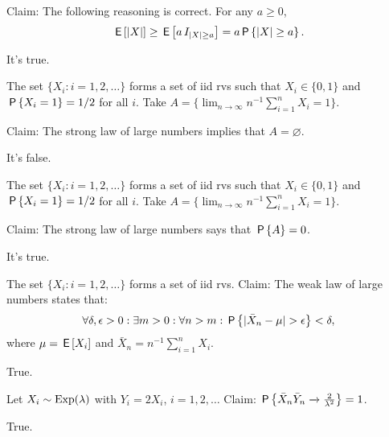 \documentclass[tf-tutorial-all.tex]{subfiles}
\begin{document}
\begin{truefalse}
Claim: The following reasoning is correct. For any $a\geq 0$,
\begin{equation}
\label{eq:8}
\E{|X|} \geq \E{a \1{|X|\geq a}} = a \P{|X| \geq a}.
\end{equation}

\begin{solution}
It's true.
\end{solution}
\end{truefalse}

\begin{truefalse}
The set $\{X_i : i = 1, 2, \ldots\}$ forms a set of iid rvs such that $X_i\in \{0, 1\}$ and $\P{X_i=1} = 1/2$ for all $i$.
Take $A=\{\lim_{n\to\infty} n^{-1}\sum_{i=1}^{n}X_i = 1\}$.

Claim: The strong law of large numbers implies that $A=\varnothing$.

\begin{solution}
It's false.
\end{solution}
\end{truefalse}

\begin{truefalse}
The set $\{X_i : i = 1, 2, \ldots\}$ forms a set of iid rvs such that $X_i\in \{0, 1\}$ and $\P{X_i=1} = 1/2$ for all $i$.
Take $A=\{\lim_{n\to\infty} n^{-1}\sum_{i=1}^{n}X_i = 1\}$.

Claim: The strong law of large numbers says that $\P{A} = 0$.

\begin{solution}
It's true.
\end{solution}
\end{truefalse}

\begin{truefalse}
The set $\{X_i : i = 1, 2, \ldots\}$ forms a set of iid rvs.
Claim: The weak law of large numbers states that:
\begin{equation}
\label{eq:9}
\forall \delta, \epsilon > 0: \exists m > 0 : \forall n > m: \P{|\bar X_{n}-\mu| > \epsilon} < \delta,
\end{equation}
where $\mu=\E{X_{i}}$ and $\bar X_n = n^{-1}\sum_{i=1}^{n}X_{i}$.
\begin{solution}
True.
\end{solution}
\end{truefalse}

\begin{truefalse}
Let $X_i \sim \Exp{\lambda}$ with $Y_i = 2X_i$, $i=1,2,\dots$ Claim: $\P{\bar{X}_n\bar{Y}_n \xrightarrow{} \frac{2}{\lambda^2}}=1$.

\begin{solution}
True.
\end{solution}
\end{truefalse}
\end{document}

